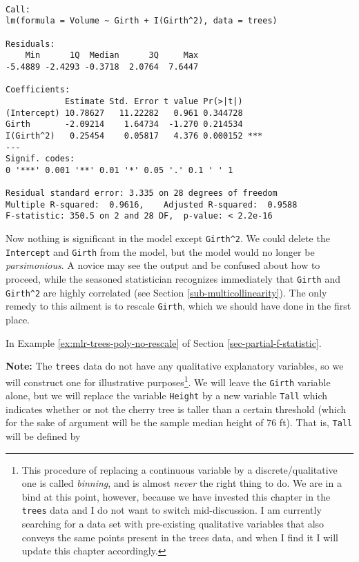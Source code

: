 \documentclass[]{book}
\let\rmarkdownfootnote\footnote%
\def\footnote{\protect\rmarkdownfootnote}
\numberwithin{equation}{chapter}
\numberwithin{figure}{chapter}
\theoremstyle{plain}
\theoremstyle{definition}
\theoremstyle{remark}
\theoremstyle{definition}
\theoremstyle{definition}
\theoremstyle{remark}
\begin{document}
\begin{verbatim}

Call:
lm(formula = Volume ~ Girth + I(Girth^2), data = trees)

Residuals:
    Min      1Q  Median      3Q     Max 
-5.4889 -2.4293 -0.3718  2.0764  7.6447 

Coefficients:
            Estimate Std. Error t value Pr(>|t|)    
(Intercept) 10.78627   11.22282   0.961 0.344728    
Girth       -2.09214    1.64734  -1.270 0.214534    
I(Girth^2)   0.25454    0.05817   4.376 0.000152 ***
---
Signif. codes:  
0 '***' 0.001 '**' 0.01 '*' 0.05 '.' 0.1 ' ' 1

Residual standard error: 3.335 on 28 degrees of freedom
Multiple R-squared:  0.9616,    Adjusted R-squared:  0.9588 
F-statistic: 350.5 on 2 and 28 DF,  p-value: < 2.2e-16
\end{verbatim}

Now nothing is significant in the model except \texttt{Girth\^{}2}. We
could delete the \texttt{Intercept} and \texttt{Girth} from the model,
but the model would no longer be \emph{parsimonious}. A novice may see
the output and be confused about how to proceed, while the seasoned
statistician recognizes immediately that \texttt{Girth} and
\texttt{Girth\^{}2} are highly correlated (see Section
\ref{sub-multicollinearity}). The only remedy to this ailment is to
rescale \texttt{Girth}, which we should have done in the first place.

In Example \ref{ex:mlr-trees-poly-no-rescale} of Section
\ref{sec-partial-f-statistic}.

\textbf{Note:} The \texttt{trees} data do not have any qualitative
explanatory variables, so we will construct one for illustrative
purposes\footnote{This procedure of replacing a continuous variable by a
  discrete/qualitative one is called \emph{binning}, and is almost
  \emph{never} the right thing to do. We are in a bind at this point,
  however, because we have invested this chapter in the \texttt{trees}
  data and I do not want to switch mid-discussion. I am currently
  searching for a data set with pre-existing qualitative variables that
  also conveys the same points present in the trees data, and when I
  find it I will update this chapter accordingly.}. We will leave the
\texttt{Girth} variable alone, but we will replace the variable
\texttt{Height} by a new variable \texttt{Tall} which indicates whether
or not the cherry tree is taller than a certain threshold (which for the
sake of argument will be the sample median height of 76 ft). That is,
\texttt{Tall} will be defined by
\end{document}
